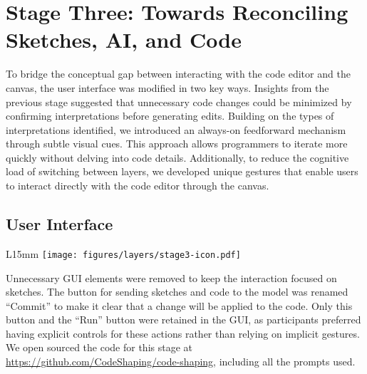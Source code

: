 



\section{Stage Three: Towards Reconciling Sketches, AI, and Code}
To bridge the conceptual gap between interacting with the code editor and the canvas, the user interface was modified in two key ways. Insights from the previous stage suggested that unnecessary code changes could be minimized by confirming interpretations before generating edits. Building on the types of interpretations identified, we introduced an always-on feedforward mechanism through subtle visual cues. This approach allows programmers to iterate more quickly without delving into code details.
Additionally, to reduce the cognitive load of switching between layers, we developed unique gestures that enable users to interact directly with the code editor through the canvas.


\subsection{User Interface}
\begin{wrapfigure}{L}{15mm}
\vspace{-3mm} \texttt{[image: figures/layers/stage3-icon.pdf]}
\end{wrapfigure} 
Unnecessary GUI elements were removed to keep the interaction focused on sketches. The button for sending sketches and code to the model was renamed ``Commit'' to make it clear that a change will be applied to the code. Only this button and the ``Run'' button were retained in the GUI, as participants preferred having explicit controls for these actions rather than relying on implicit gestures. We open sourced the code for this stage at \url{https://github.com/CodeShaping/code-shaping}, including all the prompts used.



